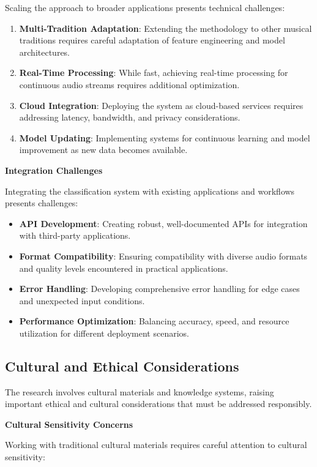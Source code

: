 \documentclass[12pt,a4paper]{article}
\begin{document}
Scaling the approach to broader applications presents technical challenges:

\begin{enumerate}
\item \textbf{Multi-Tradition Adaptation}: Extending the methodology to other musical traditions requires careful adaptation of feature engineering and model architectures.
\item \textbf{Real-Time Processing}: While fast, achieving real-time processing for continuous audio streams requires additional optimization.
\item \textbf{Cloud Integration}: Deploying the system as cloud-based services requires addressing latency, bandwidth, and privacy considerations.
\item \textbf{Model Updating}: Implementing systems for continuous learning and model improvement as new data becomes available.
\end{enumerate}

\textbf{Integration Challenges}

Integrating the classification system with existing applications and workflows presents challenges:

\begin{itemize}
\item \textbf{API Development}: Creating robust, well-documented APIs for integration with third-party applications.
\item \textbf{Format Compatibility}: Ensuring compatibility with diverse audio formats and quality levels encountered in practical applications.
\item \textbf{Error Handling}: Developing comprehensive error handling for edge cases and unexpected input conditions.
\item \textbf{Performance Optimization}: Balancing accuracy, speed, and resource utilization for different deployment scenarios.
\end{itemize}

\subsection{Cultural and Ethical Considerations}

The research involves cultural materials and knowledge systems, raising important ethical and cultural considerations that must be addressed responsibly.

\textbf{Cultural Sensitivity Concerns}

Working with traditional cultural materials requires careful attention to cultural sensitivity:
\end{document}
